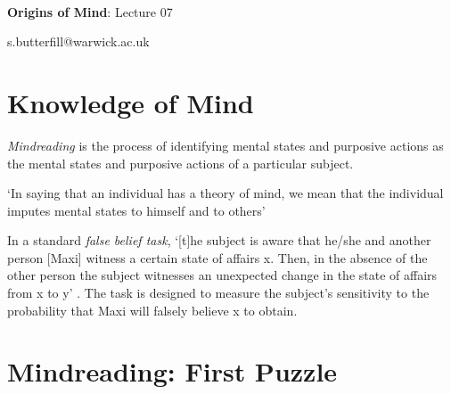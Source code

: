 \documentclass[12pt]{extarticle}
\date{}
\makeatletter
\def \ititle {Origins of Mind}
\def \isubtitle {Lecture 07}
\def \iemail{s.butterfill@warwick.ac.uk}
\makeatother
\begin{document}
\begin{multicols}{3}

\setlength\footnotesep{1em}







\def \ititle {Origins of Mind}
 
\def \isubtitle {Lecture 07}
 
 
 
\
 
 
 
\begin{center}
 
{\Large
 
\textbf{\ititle}: \isubtitle
 
}
 
 
 
\iemail %
 
\end{center}
 
 
 
\section{Knowledge of Mind}
 
\textit{Mindreading} is the process of identifying mental states and purposive actions as the mental states and purposive actions of a particular subject.
 
‘In saying that an individual has a theory of mind, we mean that the individual imputes mental states to himself and to others’
\citep[p.\ 515]{premack_does_1978}
 
In a standard \textit{false belief task}, `[t]he subject is aware that he/she and another person [Maxi] witness a certain state of affairs x. Then, in the absence of the other person the subject witnesses an unexpected change in the state of affairs from x to y' \citep[p.\ 106]{Wimmer:1983dz}. The task is designed to measure the subject's sensitivity to the probability that Maxi will falsely believe x to obtain.
 
 
 
\section{Mindreading: First Puzzle}
 

\end{multicols}
\end{document}
